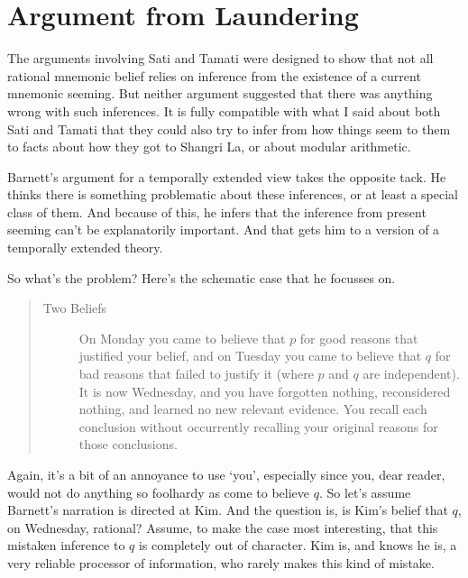 \section{Argument from Laundering}
\label{argumentfromlaundering}

The arguments involving Sati and Tamati were designed to show that not all rational mnem\-onic belief relies on inference from the existence of a current mnemonic seeming. But neither argument suggested that there was anything wrong with such inferences. It is fully compatible with what I said about both Sati and Tamati that they could also try to infer from how things seem to them to facts about how they got to Shangri La, or about modular arithmetic.

Barnett's argument for a temporally extended view takes the opposite tack. He thinks there is something problematic about these inferences, or at least a special class of them. And because of this, he infers that the inference from present seeming can't be explanatorily important. And that gets him to a version of a temporally extended theory.

So what's the problem? Here's the schematic case that he focusses on.

\begin{quote}

\begin{description}

\item[Two Beliefs]

On Monday you came to believe that $p$ for good reasons that justified your belief, and on Tuesday you came to believe that $q$ for bad reasons that failed to justify it (where $p$ and $q$ are independent). It is now Wednesday, and you have forgotten nothing, reconsidered nothing, and learned no new relevant evidence. You recall each conclusion without occurrently recalling your original reasons for those conclusions. ~\citep[15]{Barnett2015}
\end{description}
\end{quote}
Again, it's a bit of an annoyance to use `you', especially since you, dear reader, would not do anything so foolhardy as come to believe $q$. So let's assume Barnett's narration is directed at Kim. And the question is, is Kim's belief that $q$, on Wednesday, rational? Assume, to make the case most interesting, that this mistaken inference to $q$ is completely out of character. Kim is, and knows he is, a very reliable processor of information, who rarely makes this kind of mistake.

